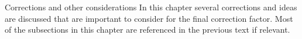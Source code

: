 \documentclass[ALICE]{ALICE_analysis_notes}
\begin{document}
\newpage

\begin{section}{Corrections and other considerations}
	In this chapter several corrections and ideas are discussed that are important to consider for the final correction factor.
	Most of the subsections in this chapter are referenced in the previous text if relevant.\\
	
%
%

\end{section}
\end{document}
